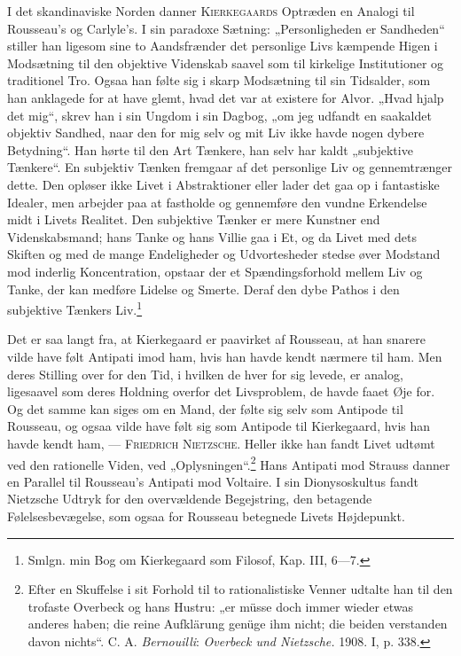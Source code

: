 \documentclass[12pt,a4paper,openany]{book}
\newcommand{\opage}[1]{\marginnote{\footnotesize\textit{[#1]}}}
\begin{document}
I det skandinaviske Norden danner \textsc{Kierkegaards} Optræden
en Analogi til Rousseau’s og Carlyle’s. I sin paradoxe Sætning:
„Personligheden er Sandheden“ stiller han ligesom sine to Aandsfrænder
det personlige Livs kæmpende Higen i Modsætning til
den objektive Videnskab saavel som til kirkelige Institutioner og
traditionel Tro. Ogsaa han følte sig i skarp Modsætning til sin
Tidsalder, som han anklagede for at have glemt, hvad det var
at existere for Alvor. „Hvad hjalp det mig“, skrev han i sin
Ungdom i sin Dagbog, „om jeg udfandt en saakaldet objektiv
Sandhed, naar den for mig selv og mit Liv ikke havde nogen
dybere Betydning“. Han hørte til den Art Tænkere, han selv
har kaldt „subjektive Tænkere“. En subjektiv Tænken fremgaar
\setcounter{footnote}{0}%
\opage{127}af det personlige Liv og gennemtrænger dette. Den opløser ikke
Livet i Abstraktioner eller lader det gaa op i fantastiske Idealer,
men arbejder paa at fastholde og gennemføre den vundne Erkendelse
midt i Livets Realitet. Den subjektive Tænker er mere
Kunstner end Videnskabsmand; hans Tanke og hans Villie gaa
i Et, og da Livet med dets Skiften og med de mange Endeligheder
og Udvortesheder stedse øver Modstand mod inderlig Koncentration,
opstaar der et Spændingsforhold mellem Liv og Tanke,
der kan medføre Lidelse og Smerte. Deraf den dybe Pathos i
den subjektive Tænkers Liv.\footnote[1]{Smlgn. min Bog om Kierkegaard som Filosof, Kap. III, 6---7.}

Det er saa langt fra, at Kierkegaard er paavirket af Rousseau,
at han snarere vilde have følt Antipati imod ham, hvis
han havde kendt nærmere til ham. Men deres Stilling over for
den Tid, i hvilken de hver for sig levede, er analog, ligesaavel
som deres Holdning overfor det Livsproblem, de havde faaet
Øje for. Og det samme kan siges om en Mand, der følte sig
selv som Antipode til Rousseau, og ogsaa vilde have følt sig
som Antipode til Kierkegaard, hvis han havde kendt ham,
--- \textsc{Friedrich Nietzsche}. Heller ikke han fandt Livet udtømt ved
den rationelle Viden, ved „Oplysningen“.\footnote[2]{Efter en Skuffelse i sit Forhold til to rationalistiske Venner udtalte han til den trofaste Overbeck og hans Hustru: „er müsse doch immer wieder etwas anderes haben; die reine Aufklärung genüge ihm nicht; die beiden verstanden davon nichts“. C. A. \emph{Bernouilli}: \textit{Overbeck und Nietzsche.} 1908. I, p. 338.} Hans Antipati mod
Strauss danner en Parallel til Rousseau’s Antipati mod Voltaire.
I sin Dionysoskultus fandt Nietzsche Udtryk for den overvældende
Begejstring, den betagende Følelsesbevægelse, som ogsaa for
Rousseau betegnede Livets Højdepunkt.
\end{document}
